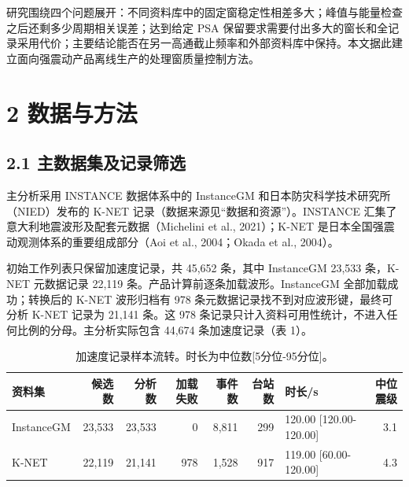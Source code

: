 \documentclass[UTF8,a4paper,zihao=5]{ctexart}
\begin{document}
研究围绕四个问题展开：不同资料库中的固定窗稳定性相差多大；峰值与能量检查之后还剩多少周期相关误差；达到给定 PSA 保留要求需要付出多大的窗长和全记录采用代价；主要结论能否在另一高通截止频率和外部资料库中保持。本文据此建立面向强震动产品离线生产的处理窗质量控制方法。

\section*{2 数据与方法}\label{ux6570ux636eux4e0eux65b9ux6cd5}

\subsection*{2.1 主数据集及记录筛选}\label{ux4e3bux6570ux636eux96c6ux53caux8bb0ux5f55ux7b5bux9009}

主分析采用 INSTANCE 数据体系中的 InstanceGM 和日本防灾科学技术研究所（NIED）发布的 K-NET 记录（数据来源见``数据和资源''）。INSTANCE 汇集了意大利地震波形及配套元数据（Michelini et al., 2021）；K-NET 是日本全国强震动观测体系的重要组成部分（Aoi et al., 2004；Okada et al., 2004）。

初始工作列表只保留加速度记录，共 45,652 条，其中 InstanceGM 23,533 条，K-NET 元数据记录 22,119 条。产品计算前逐条加载波形。InstanceGM 全部加载成功；转换后的 K-NET 波形归档有 978 条元数据记录找不到对应波形键，最终可分析 K-NET 记录为 21,141 条。这 978 条记录只计入资料可用性统计，不进入任何比例的分母。主分析实际包含 44,674 条加速度记录（表 1）。

\begin{table}[!htbp]
\centering
\caption{加速度记录样本流转。时长为中位数[5分位-95分位]。}
\label{tab:dataset}
\begin{singlespace}
\footnotesize
\setlength{\tabcolsep}{3pt}
\begin{tabular*}{\textwidth}{@{\extracolsep{\fill}}lrrrrrlr@{}}
\toprule
资料集 & 候选数 & 分析数 & 加载失败 & 事件数 & 台站数 & 时长/s & 中位震级 \\
\midrule
InstanceGM & 23,533 & 23,533 & 0 & 8,811 & 299 & 120.00 [120.00-120.00] & 3.1 \\
K-NET & 22,119 & 21,141 & 978 & 1,528 & 917 & 119.00 [60.00-120.00] & 4.3 \\
\bottomrule
\end{tabular*}
\end{singlespace}
\end{table}
\end{document}
